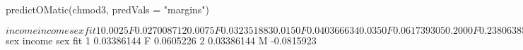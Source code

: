 \begin{Schunk}
\begin{Sinput}
 predictOMatic(chmod3, predVals = "margins")
\end{Sinput}
\begin{Soutput}
$income
  income sex        fit
1 0.0025   F 0.02700871
2 0.0075   F 0.03235188
3 0.0150   F 0.04036663
4 0.0350   F 0.06173930
5 0.2000   F 0.23806385

$sex
      income sex        fit
1 0.03386144   F  0.0605226
2 0.03386144   M -0.0815923
\end{Soutput}
\end{Schunk}

